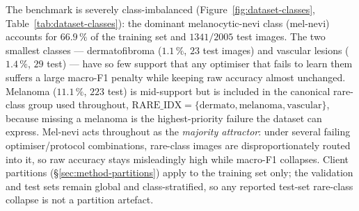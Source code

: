 \documentclass[11pt,a4paper]{report}
\begin{document}
The benchmark is severely class-imbalanced (Figure~\ref{fig:dataset-classes},
Table~\ref{tab:dataset-classes}): the
dominant melanocytic-nevi class (mel-nevi) accounts for $66.9\,\%$ of the training
set and $1341 / 2005$ test images. The two smallest classes --- dermatofibroma
($1.1\,\%$, $23$ test images) and vascular lesions ($1.4\,\%$, $29$ test) --- have
so few support that any optimiser that fails to learn them suffers a large
macro-F1 penalty while keeping raw accuracy almost unchanged. Melanoma
($11.1\,\%$, $223$ test) is mid-support but is included in the canonical
rare-class group used throughout, $\mathrm{RARE\_IDX} = \{\text{dermato},
\text{melanoma}, \text{vascular}\}$, because missing a melanoma is the
highest-priority failure the dataset can express. Mel-nevi acts throughout as the
\emph{majority attractor}: under several failing optimiser/protocol combinations,
rare-class images are disproportionately routed into it, so raw accuracy stays
misleadingly high while macro-F1 collapses. Client partitions
(\S\ref{sec:method-partitions}) apply to the training set only; the validation and
test sets remain global and class-stratified, so any reported test-set rare-class
collapse is not a partition artefact.

\begin{table}[H]
\centering
\small
\caption{DermaMNIST class supports and roles in this thesis. Train
prevalence and test support are computed directly from the MedMNIST~v2
release; the train support totals $7007$ and the test support totals
$2005$. The rare-class group $\mathrm{RARE\_IDX} = \{\text{dermato},
\text{melanoma}, \text{vascular}\}$ defines the rare-class F1 used
throughout Chapter~\ref{ch:results}.}
\label{tab:dataset-classes}
\end{table}
\end{document}
